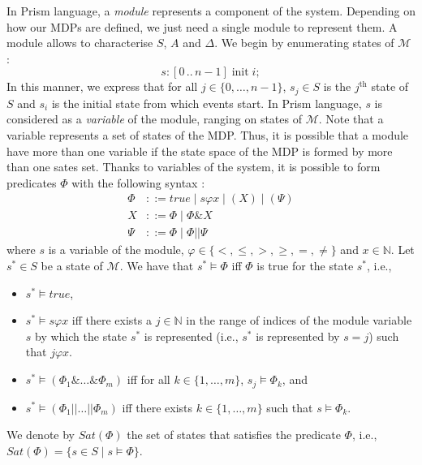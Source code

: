 In Prism language, a \textit{module} represents a component of the system.
Depending on how our MDPs are defined, we just need a single module to
represent them. A module allows to characterise $S$, $A$ and $\Delta$. We begin by enumerating states of $\mathcal{M}$ :
\[
  s: [0\, ..\, n-1] \; \text{init} \; i;
\]
In this manner, we express that for all $j \in \{0, \dots, n-1\}$, $s_j \in S$
is the $j^{\text{th}}$ state of $S$ and $s_i$ is the initial state from which events start. In Prism language, $s$ is considered as a \textit{variable} of the module, ranging on states of $\mathcal{M}$. Note that a variable represents a set of states of the MDP. Thus, it is possible that a module have more than one variable if the state space of the MDP is formed by more than one sates set.
Thanks to variables of the system, it is possible to form predicates $\Phi$ with the following  syntax :
\begin{align*}
  \Phi &::= true \; | \; s \varphi x \; | \; (X) \; | \; (\Psi) \\
  X &::= \Phi \; | \; \Phi \& X \\
  \Psi &::= \Phi \; | \; \Phi || \Psi
\end{align*}
where $s$ is a variable of the module, $\varphi \in \{<, \leq, >, \geq, =, \neq\}$
and $x \in \mathbb{N}$. Let $s^* \in S$ be a state of $\mathcal{M}$. We have that $s^* \models \Phi$ iff $\Phi$ is true for the state $s^*$, i.e.,
\begin{itemize}
  \item $s^* \models true$,
  \item $s^* \models s \varphi x$ iff there exists a $j \in \mathbb{N}$ in the range of indices of the module variable $s$ by which the state $s^*$ is represented (i.e., $s^*$ is represented by $s=j$) such that $j \varphi x$.
  \item $s^* \models (\Phi_1 \& \dots \& \Phi_m)$ iff
    for all $k \in \{1, \dots, m\}$, $s_j \models \Phi_k$, and
  \item $s^* \models (\Phi_1 || \dots || \Phi_m)$ iff
    there exists $k \in \{1, \dots, m\}$ such that $s \models \Phi_k$.
\end{itemize}
We denote by $Sat(\Phi)$ the set of states that satisfies the predicate $\Phi$, i.e., $Sat(\Phi) = \{s \in S \; | \; s \models \Phi\}$. \\

